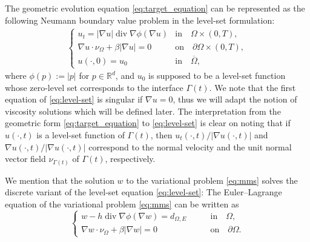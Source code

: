 \documentclass[11pt]{article}
\numberwithin{equation}{section}
\newcommand{\R}{\mathbb{R}}
\newcommand{\pOmega}[0]{\partial\Omega}
\begin{document}
The geometric evolution equation \eqref{eq:target_equation} can be represented as the following Neumann boundary value problem in the level-set formulation:
\begin{align}\label{eq:level-set}
\begin{cases}
    u_t = |\nabla u| \operatorname{div} \nabla \phi(\nabla u) & \text{in} \quad \Omega \times (0,T), \\
    \nabla u \cdot \nu_{\Omega}  + \beta |\nabla u| = 0 & \text{on} \quad \partial\Omega \times (0,T), \\
    u(\cdot,0) = u_0 & \text{in} \quad \overline{\Omega},
\end{cases}
\end{align}
where $\phi(p) := |p|$ for $p\in\R^d$, and $u_0$ is supposed to be a level-set function whose zero-level set corresponds to the interface $\Gamma(t)$. We note that the first equation of \eqref{eq:level-set} is singular if $\nabla u = 0$, thus we will adapt the notion of viscosity solutions which will be defined later. The interpretation from the geometric form \eqref{eq:target_equation} to \eqref{eq:level-set} is clear on noting that if $u(\cdot, t)$ is a level-set function of $\Gamma(t)$, then $u_t(\cdot,t)/|\nabla u(\cdot,t)|$ and $\nabla u(\cdot,t) / |\nabla u(\cdot,t)|$ correspond to the normal velocity and the unit normal vector field $\nu_{\Gamma(t)}$ of $\Gamma(t)$, respectively.

We mention that the solution $w$ to the variational problem \eqref{eq:mms} solves the discrete variant of the level-set equation \eqref{eq:level-set}: The Euler--Lagrange equation of the variational problem \eqref{eq:mms} can be written as 
\begin{equation}
    \label{eq:intro-discrete-PDE}
    \begin{cases}
        w - h\operatorname{div}\nabla\phi(\nabla w) = d_{\Omega,E} & \qquad\mbox{in}\quad\Omega,\\ 
        \nabla w\cdot\nu_\Omega + \beta|\nabla w| = 0 & \qquad\mbox{on}\quad\pOmega.
    \end{cases}
\end{equation}
\end{document}
